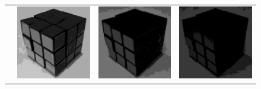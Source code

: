 \begin{figure}
\begin{tabular}{rccc}
         \raisebox{\raiselength}{Green} &
         \includegraphics[width=\rubiklength]{img/rubik/1_rgb_g.jpg} & 
         \includegraphics[width=\rubiklength]{img/rubik/2_rgb_g.jpg} & \includegraphics[width=\rubiklength]{img/rubik/3_rgb_g.jpg}\\
         

\end{tabular}
\end{figure}
